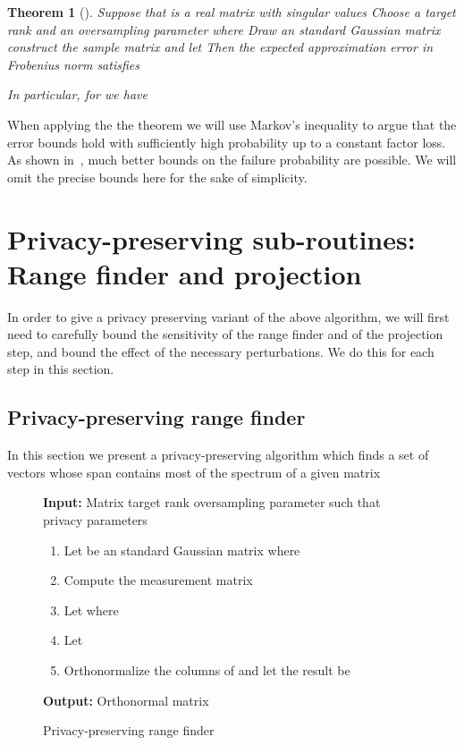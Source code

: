 \documentclass[letterpaper,11pt]{article}
\newtheorem{theorem}{Theorem}[section]
\theoremstyle{definition}
\newcommand{\figurelabel}[1]{\label{fig:#1}}
\newcommand{\sectionlabel}[1]{\label{sec:#1}}
\begin{document}
\begin{theorem}[\cite{HalkoMT11}]
\label{thm:HMT}
Suppose that  is a real  matrix with singular values
 Choose a target rank  and an
oversampling parameter  where  Draw an
 standard Gaussian matrix  construct the sample
matrix  and let 
Then the expected approximation error in Frobenius norm satisfies

In particular, for  we have

\end{theorem}
When applying the the theorem we will use Markov's inequality to argue that
the error bounds hold with sufficiently high probability up to a constant
factor loss. As shown in~\cite{HalkoMT11}, much better bounds on the failure
probability are possible. We will omit the precise bounds here for the sake of
simplicity.

\section{Privacy-preserving sub-routines: Range finder and projection}
\sectionlabel{range-projection}

In order to give a privacy preserving variant of the above algorithm, we will
first need to carefully bound the sensitivity of the range finder and of the
projection step, and bound the effect of the necessary perturbations. We do
this for each step in this section.


\subsection{Privacy-preserving range finder}
\sectionlabel{range-finder}

In this section we present a privacy-preserving algorithm which finds a set of
vectors  whose span contains most of the spectrum of a given
matrix~

\begin{figure}[ht]
\begin{boxedminipage}{\textwidth}
{\bf Input:} Matrix  target rank  oversampling
parameter  such that  privacy parameters 
\begin{enumerate}
\item Let  be an  standard Gaussian matrix where 
\item Compute the  measurement matrix 
\item Let  where

\item Let 
\item Orthonormalize the columns of  and let the result be 
\end{enumerate}
{\bf Output:} Orthonormal  matrix 
\end{boxedminipage}
\caption{Privacy-preserving range finder}
\figurelabel{range-finder}
\end{figure}
\end{document}
